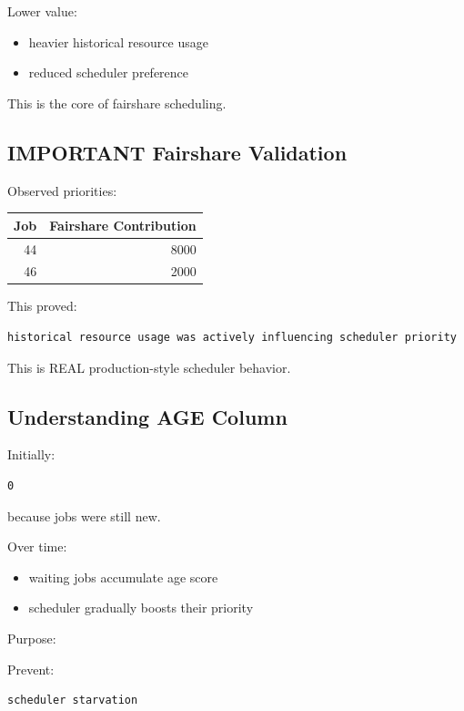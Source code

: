 \documentclass[11pt]{article}
\begin{document}
Lower value:

\begin{itemize}
\item heavier historical resource usage
\item reduced scheduler preference
\end{itemize}

This is the core of fairshare scheduling.
\subsection{IMPORTANT Fairshare Validation}
\label{sec:orga62b7c8}

Observed priorities:

\begin{center}
\begin{tabular}{rr}
Job & Fairshare Contribution\\
\hline
44 & 8000\\
46 & 2000\\
\end{tabular}
\end{center}

This proved:

\begin{verbatim}
historical resource usage was actively influencing scheduler priority
\end{verbatim}

This is REAL production-style scheduler behavior.
\subsection{Understanding AGE Column}
\label{sec:orgc2d5240}

Initially:

\begin{verbatim}
0
\end{verbatim}

because jobs were still new.

Over time:

\begin{itemize}
\item waiting jobs accumulate age score
\item scheduler gradually boosts their priority
\end{itemize}

Purpose:

Prevent:

\begin{verbatim}
scheduler starvation
\end{verbatim}
\end{document}
